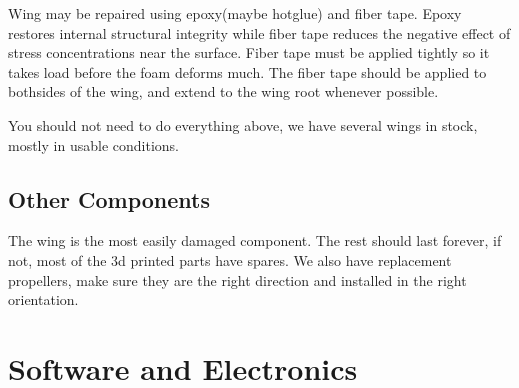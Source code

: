 \documentclass[12pt]{article}
\begin{document}
Wing may be repaired using epoxy(maybe hotglue) and fiber tape. Epoxy restores internal structural integrity while fiber tape reduces the negative effect of stress concentrations near the surface. Fiber tape must be applied tightly so it takes load before the foam deforms much. The fiber tape should be applied to bothsides of the wing, and extend to the wing root whenever possible. 

You should not need to do everything above, we have several wings in stock, mostly in usable conditions. 

\subsection{Other Components}
The wing is the most easily damaged component. The rest should last forever, if not, most of the 3d printed parts have spares. We also have replacement propellers, make sure they are the right direction and installed in the right orientation.

\section{Software and Electronics}
\end{document}
